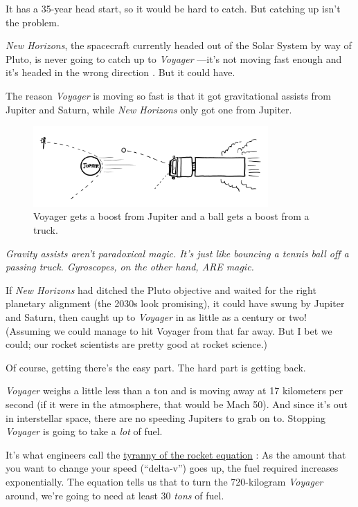 {It has a 35-year head start, so it would be hard to catch. But catching up isn’t the problem.}

{ \emph{New Horizons}, the spacecraft currently headed out of the Solar System by way of Pluto, is never going to catch up to \emph{Voyager} —it’s not moving fast enough and it’s headed in the wrong direction \emph{.} But it could have.}

{The reason \emph{Voyager} is moving so fast is that it got gravitational assists from Jupiter and Saturn, while \emph{New Horizons} only got one from Jupiter.}

\begin{figure}[!htbp]
\centering
\includegraphics[scale=0.5, max width=0.8\textwidth]{imgs/a/38/voyager_assist.png}
\caption{Voyager gets a boost from Jupiter and a ball gets a boost from a truck.}
\end{figure}

{ \emph{Gravity assists aren’t paradoxical magic. It’s just like bouncing a tennis ball off a passing truck. Gyroscopes, on the other hand, ARE magic.} }

{If \emph{New Horizons} had ditched the Pluto objective and waited for the right planetary alignment (the 2030s look promising), it could have swung by Jupiter and Saturn, then caught up to \emph{Voyager} in as little as a century or two! (Assuming we could manage to hit Voyager from that far away. But I bet we could; our rocket scientists are pretty good at rocket science.)}

{Of course, getting there’s the easy part. The hard part is getting back.}

{ \emph{Voyager} weighs a little less than a ton and is moving away at 17 kilometers per second (if it were in the atmosphere, that would be Mach 50). And since it’s out in interstellar space, there are no speeding Jupiters to grab on to. Stopping \emph{Voyager} is going to take a \emph{lot} of fuel.}

{It’s what engineers call the \href{http://www.nasa.gov/mission\_pages/station/expeditions/expedition30/tryanny.html}{tyranny of the rocket equation} : As the amount that you want to change your speed (“delta-v”) goes up, the fuel required increases exponentially. The equation tells us that to turn the 720-kilogram \emph{Voyager} around, we’re going to need at least 30 \emph{tons} of fuel.}

